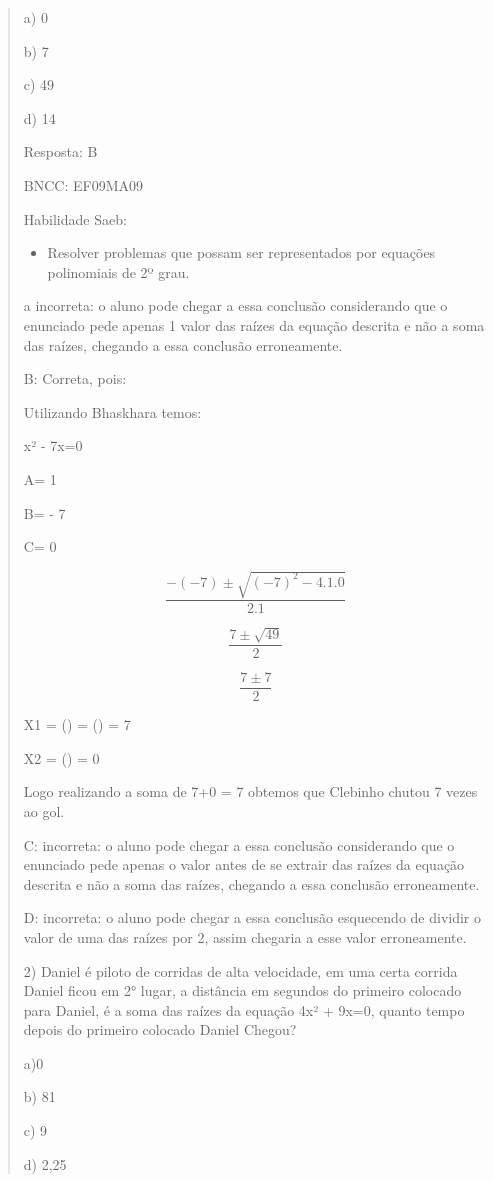 \begin{quote}
\begin{escolha}
a) 0

b) 7

c) 49

d) 14

Resposta: B

BNCC: EF09MA09

Habilidade Saeb:

\begin{itemize}
\tightlist
\item
  Resolver problemas que possam ser representados por equações
  polinomiais de 2º grau.
\end{itemize}

a incorreta: o aluno pode chegar a essa conclusão considerando que o
enunciado pede apenas 1 valor das raízes da equação descrita e não a
soma das raízes, chegando a essa conclusão erroneamente.

B: Correta, pois:

Utilizando Bhaskhara temos:

x² - 7x=0

A= 1

B= - 7

C= 0

\[\frac{- ( - 7) \pm \sqrt{{( - 7)}^{2} - 4.1.0}}{2.1}\]

\[\frac{7 \pm \sqrt{49}}{2}\]

\[\frac{7 \pm 7}{2}\]

X1 = () = () = 7

X2 = () = 0

Logo realizando a soma de 7+0 = 7 obtemos que Clebinho chutou 7 vezes ao
gol.

C: incorreta: o aluno pode chegar a essa conclusão considerando que o
enunciado pede apenas o valor antes de se extrair das raízes da equação
descrita e não a soma das raízes, chegando a essa conclusão
erroneamente.

D: incorreta: o aluno pode chegar a essa conclusão esquecendo de dividir
o valor de uma das raízes por 2, assim chegaria a esse valor
erroneamente.

2) Daniel é piloto de corridas de alta velocidade, em uma certa corrida
Daniel ficou em 2° lugar, a distância em segundos do primeiro colocado
para Daniel, é a soma das raízes da equação 4x² + 9x=0, quanto tempo
depois do primeiro colocado Daniel Chegou?

a)0

b) 81

c) 9

d) 2,25


\end{escolha}
\end{quote}
